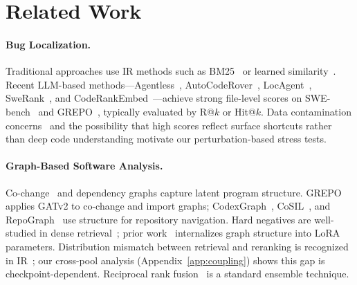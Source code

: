 \documentclass{article}
\begin{document}
\section{Related Work}
\label{sec:related}

\paragraph{Bug Localization.}
Traditional approaches use IR methods such as BM25~\citep{robertson2009probabilistic} or learned similarity~\citep{huo2016learning, lam2017bug}.
Recent LLM-based methods---Agentless~\citep{xia2024agentless}, AutoCodeRover~\citep{zhang2024autocoderover}, LocAgent~\citep{chen2025locagent}, SweRank~\citep{reddy2025swerank}, and CodeRankEmbed~\citep{suresh2025cornstack}---achieve strong file-level scores on SWE-bench~\citep{jimenez2024swebench} and GREPO~\citep{wang2026grepo}, typically evaluated by R@$k$ or Hit@$k$.
Data contamination concerns~\citep{liang2025swebench} and the possibility that high scores reflect surface shortcuts rather than deep code understanding motivate our perturbation-based stress tests.

\paragraph{Graph-Based Software Analysis.}
Co-change~\citep{zimmermann2004mining, ying2004predicting, zimmermann2008predicting} and dependency graphs capture latent program structure.
GREPO~\citep{wang2026grepo} applies GATv2 to co-change and import graphs; CodexGraph~\citep{liu2025codexgraph}, CoSIL~\citep{jiang2025cosil}, and RepoGraph~\citep{ouyang2025repograph} use structure for repository navigation.
Hard negatives are well-studied in dense retrieval~\citep{xiong2021approximate, qu2021rocketqa}; prior work~\citep{feng2025grip} internalizes graph structure into LoRA parameters.
Distribution mismatch between retrieval and reranking is recognized in IR~\citep{gao2021lce, jacob2024drowning}; our cross-pool analysis (Appendix~\ref{app:coupling}) shows this gap is checkpoint-dependent.
Reciprocal rank fusion~\citep{cormack2009rrf} is a standard ensemble technique.
\end{document}

